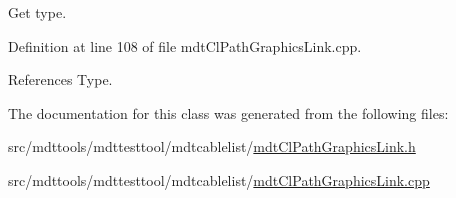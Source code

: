 Get type. 



Definition at line 108 of file mdt\-Cl\-Path\-Graphics\-Link.\-cpp.



References Type.



The documentation for this class was generated from the following files\-:\begin{DoxyCompactItemize}
\item 
src/mdttools/mdttesttool/mdtcablelist/\hyperlink{mdt_cl_path_graphics_link_8h}{mdt\-Cl\-Path\-Graphics\-Link.\-h}\item 
src/mdttools/mdttesttool/mdtcablelist/\hyperlink{mdt_cl_path_graphics_link_8cpp}{mdt\-Cl\-Path\-Graphics\-Link.\-cpp}\end{DoxyCompactItemize}
